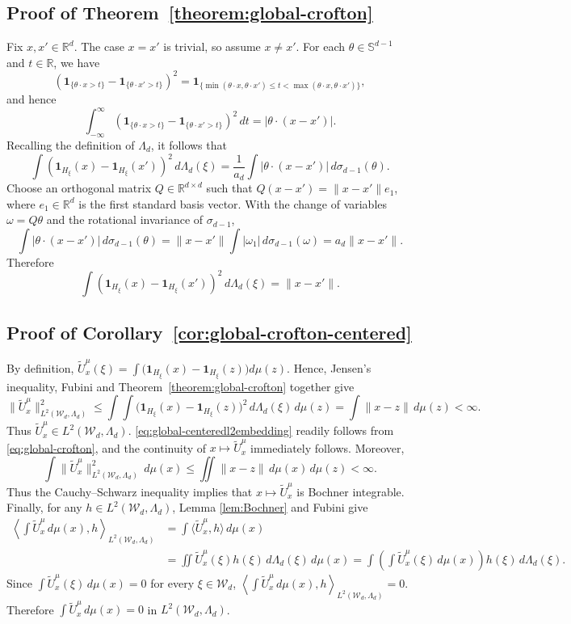 \documentclass[11pt]{amsart}
\theoremstyle{definition}
\theoremstyle{remark}
\newcommand{\R}{\mathbb{R}}
\newcommand{\1}{\mathbf{1}}
\newcommand{\Sd}{\mathbb{S}}
\newcommand{\one}{\mathbf{1}}
\numberwithin{equation}{section}
\begin{document}
\subsection{Proof of Theorem~\ref{theorem:global-crofton}}
\label{pf:global-crofton}

Fix $x,x'\in\R^d$. The case $x=x'$ is trivial, so assume
$x\neq x'$. For each $\theta\in\Sd^{d-1}$ and $t\in\R$, we have
\[
\left(
\one_{\{\theta\cdot x>t\}}
-
\one_{\{\theta\cdot x'>t\}}
\right)^2
=
\one_{\{
\min(\theta\cdot x,\theta\cdot x')
\leq t<
\max(\theta\cdot x,\theta\cdot x')
\}},
\]
and hence
\[
\int_{-\infty}^{\infty}
\left(
\one_{\{\theta\cdot x>t\}}
-
\one_{\{\theta\cdot x'>t\}}
\right)^2
\,dt
=
|\theta\cdot(x-x')|.
\]
Recalling the definition of $\Lambda_d$, it follows that
\[
\int
\left(
\one_{H_\xi}(x)-\one_{H_\xi}(x')
\right)^2
\,d\Lambda_d(\xi)
=
\frac{1}{a_d}
\int
|\theta\cdot(x-x')|
\,d\sigma_{d-1}(\theta).
\]
Choose an orthogonal matrix $Q\in\R^{d\times d}$ such that
$Q(x-x')=\|x-x'\|e_1$, where $e_1\in\R^d$ is the first standard basis
vector. With the change of variables $\omega=Q\theta$ and the
rotational invariance of $\sigma_{d-1}$,
\[
\int
|\theta\cdot(x-x')|
\,d\sigma_{d-1}(\theta)
=
\|x-x'\|
\int
|\omega_1|
\,d\sigma_{d-1}(\omega)
=
a_d\|x-x'\|.
\]
Therefore
\[
\int
\left(
\one_{H_\xi}(x)-\one_{H_\xi}(x')
\right)^2
\,d\Lambda_d(\xi)
=
\|x-x'\|.
\]
\subsection{Proof of Corollary~\ref{cor:global-crofton-centered}}
\label{pf:global-crofton-centered}
By definition,
$\widetilde U_x^\mu(\xi)
=
\int
\bigl(\one_{H_\xi}(x)-\one_{H_\xi}(z)\bigr)
d\mu(z).$
Hence, Jensen's inequality, Fubini and
Theorem~\ref{theorem:global-crofton} together give
\[
\|\widetilde U_x^\mu\|^2_{L^2(\mathcal{W}_d, \Lambda_d)} \leq
\int\!\!\int
\bigl(\one_{H_\xi}(x)-\one_{H_\xi}(z)\bigr)^2
\,d\Lambda_d(\xi)\,d\mu(z) =
\int\|x-z\|\,d\mu(z) <\infty.
\]
Thus $\widetilde U_x^\mu\in L^2(\mathcal W_d,\Lambda_d)$.
\eqref{eq:global-centeredl2embedding} readily follows from \eqref{eq:global-crofton}, and the continuity of $x\mapsto \widetilde U_x^\mu$ immediately follows. Moreover,
\[
\int\|\widetilde U_x^\mu\|^2_{L^2(\mathcal W_d,\Lambda_d)}\,d\mu(x)
\leq
\iint\|x-z\|\,d\mu(x)\,d\mu(z)
<\infty.
\]
Thus the Cauchy--Schwarz inequality implies that $x\mapsto \widetilde U_x^{\mu}$ is Bochner integrable.
Finally, for any $h\in L^2(\mathcal W_d,\Lambda_d)$, Lemma \ref{lem:Bochner} and Fubini give
\begin{align*}
\left\langle
\int \widetilde U_x^\mu\,d\mu(x),h
\right\rangle_{L^2(\mathcal W_d,\Lambda_d)}
&=
\int\langle \widetilde U_x^\mu,h\rangle\,d\mu(x)\\
&=
\iint
\widetilde U_x^\mu(\xi)h(\xi)
\,d\Lambda_d(\xi)\,d\mu(x) =
\int
\left(
\int \widetilde U_x^\mu(\xi)\,d\mu(x)
\right)
h(\xi)\,d\Lambda_d(\xi).
\end{align*}
Since $\int \widetilde U_x^\mu(\xi)\,d\mu(x)=0$ for every $\xi\in\mathcal W_d$,
$\left\langle
\int \widetilde U_x^\mu\,d\mu(x),h
\right\rangle_{L^2(\mathcal W_d,\Lambda_d)}
=
0.$ Therefore
$\int \widetilde U_x^\mu\,d\mu(x)=0$ in
$L^2(\mathcal W_d,\Lambda_d)$.
\end{document}

